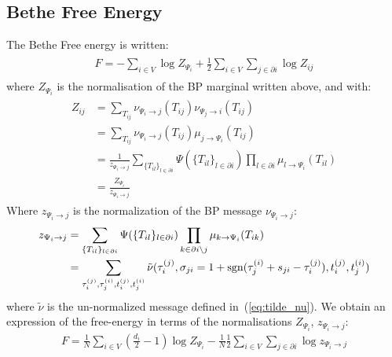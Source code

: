 \documentclass[a4paper, amsfonts, amssymb, amsmath, reprint, showkeys, nofootinbib, twoside, floatfix, pre,superscriptaddress, onecolumn]{revtex4-2}
\begin{document}
\subsection{Bethe Free Energy}
The Bethe Free energy is written:
\begin{align}
\begin{aligned}
F = -\sum_{i\in V}\log Z_{\Psi_i} + \frac{1}{2}\sum_{i\in V}\sum_{j\in\partial i}\log Z_{ij}
\end{aligned}
\end{align}
where $Z_{\Psi_i}$ is the normalisation of the BP marginal written above, and with:
\begin{align}
\begin{aligned}
Z_{ij} &= \sum_{T_{ij}}\nu_{\Psi_i\to j}(T_{ij})\nu_{\Psi_j\to i}(T_{ij}) \\
&= \sum_{T_{ij}}\nu_{\Psi_i\to j}(T_{ij})\mu_{j\to \Psi_i}(T_{ij}) \\
&= \frac{1}{z_{\Psi_i\to j}}\sum_{\{T_{il}\}_{l\in\partial i}}\Psi(\{T_{il}\}_{l\in\partial i})\prod_{l\in\partial i}\mu_{l\to \Psi_i}(T_{il}) \\
&= \frac{Z_{\Psi_i}}{z_{\Psi_i\to j}}
\end{aligned}
\end{align}
Where $z_{\Psi_i\to j}$ is the normalization of the BP message $\nu_{\Psi_i\to j}$:
\begin{align}
\begin{aligned}
z_{\Psi_i\to j} &= \sum_{\{T_{il}\}_{l\in\partial i}}\Psi(\{T_{il}\}_{l\in\partial i})\prod_{k\in\partial i\setminus j}\mu_{k\to \Psi_i}(T_{ik}) \\
&= \sum_{\tau_i^{(j)},\tau_j^{(i)},t_i^{(j)},t_j^{(i)}}\tilde{\nu}(\tau_i^{(j)},\sigma_{ji}=1+{\rm sgn}(\tau_j^{(i)}+s_{ji}-\tau_i^{(j)}), t_i^{(j)},t_j^{(i)})
\end{aligned}
\end{align}
where $\tilde{\nu}$ is the un-normalized message defined in~(\ref{eq:tilde_nu}).
We obtain an expression of the free-energy in terms of the normalisations $Z_{\Psi_i}$, $z_{\Psi_i\to j}$:
\begin{align}
F = \frac{1}{N}\sum_{i\in V}\left(\frac{d_i}{2}-1\right)\log Z_{\Psi_i} - \frac{1}{N}\frac{1}{2}\sum_{i\in V}\sum_{j\in\partial i}\log z_{\Psi_i\to j}
\end{align}
\end{document}
